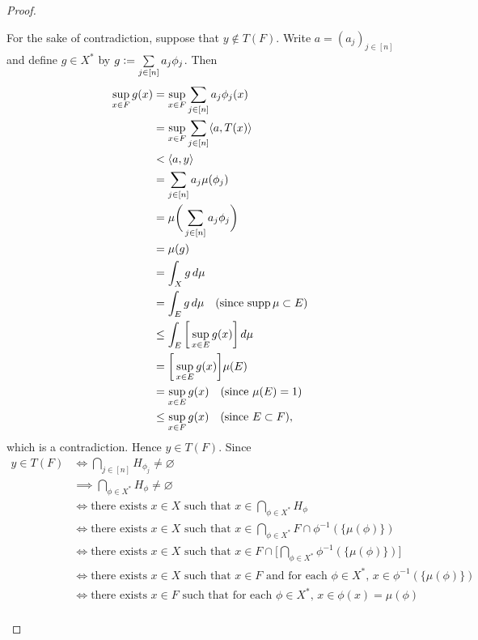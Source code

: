 \documentclass{book}
\begin{document}
\begin{proof}
\begin{enumerate}
\begin{itemize}
				For the sake of contradiction, suppose that $y \not \in T(F)$. Write $a = (a_{j})_{j \in [n]}$ and define $g \in X^*$ by $g \vcentcolon= \sum\limits_{j \in [n]} a_j \phi_j$. Then 
				\begin{align*}
					\sup\limits_{x \in F} g(x)
					& = \sup\limits_{x \in F} \sum\limits_{j \in [n]} a_j \phi_j(x) \\
					& = \sup\limits_{x \in F} \sum\limits_{j \in [n]} \langle a, T(x) \rangle \\
					& < \langle a, y \rangle \\
					& = \sum\limits_{j \in [n]} a_j \mu(\phi_j) \\
					& = \mu\bigg( \sum\limits_{j \in [n]} a_j \phi_j \bigg) \\
					& = \mu (g) \\
					& = \int_X g \, d \mu \\
					& = \int_E g \, d \mu \quad \text{(since $\operatorname{supp} \mu \subset E$)} \\
					& \leq \int_E \bigg[ \sup\limits_{x \in E} g(x) \bigg] \, d \mu \\
					& = \bigg[ \sup\limits_{x \in E} g(x) \bigg] \mu(E) \\
					& = \sup\limits_{x \in E} g(x) \quad \text{(since $\mu(E) = 1$)} \\
					& \leq \sup\limits_{x \in F} g(x) \quad \text{(since $E \subset F$)},
				\end{align*} 
				which is a contradiction. Hence $y \in T(F)$. Since 
				\begin{align*}
					y \in T(F)
					& \iff \bigcap\limits_{j \in [n]} H_{\phi_j} \neq \varnothing \\
					& \implies \bigcap\limits_{\phi \in X^*} H_{\phi} \neq \varnothing \\
					& \iff \text{there exists $x \in X$ such that $x \in  \bigcap\limits_{\phi \in X^*} H_{\phi}$} \\
					& \iff \text{there exists $x \in X$ such that $x \in  \bigcap\limits_{\phi \in X^*} F \cap \phi^{-1}(\{\mu(\phi)\})$} \\
					& \iff \text{there exists $x \in X$ such that $x \in F \cap \bigg[ \bigcap\limits_{\phi \in X^*} \phi^{-1}(\{\mu(\phi)\}) \bigg]$} \\
					& \iff \text{there exists $x \in X$ such that $x \in F$ and for each $\phi \in X^*$, $x \in \phi^{-1}(\{\mu(\phi)\})$} \\
					& \iff \text{there exists $x \in F$ such that for each $\phi \in X^*$, $x \in \phi(x) = \mu(\phi)$} \\

\end{align*}
\end{itemize}
\end{enumerate}
\end{proof}
\end{document}
